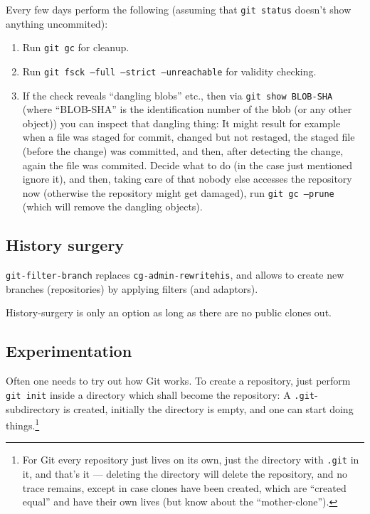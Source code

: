 \documentclass{book}
\newcommand{\filename}[1]{\texttt{#1}}
\begin{document}
Every few days perform the following (assuming that \texttt{git status} doesn't show anything uncommited):
\begin{enumerate}
\item Run \texttt{git gc} for cleanup.
\item Run \texttt{git fsck --full --strict --unreachable}  for validity checking.
\item If the check reveals ``dangling blobs'' etc., then via \texttt{git show BLOB-SHA} (where ``BLOB-SHA'' is the identification number of the blob (or any other object)) you can inspect that dangling thing: It might result for example when a file was staged for commit, changed but not restaged, the staged file (before the change) was committed, and then, after detecting the change, again the file was commited. Decide what to do (in the case just mentioned ignore it), and then, taking care of that nobody else accesses the repository now (otherwise the repository might get damaged), run \texttt{git gc --prune} (which will remove the dangling objects).
\end{enumerate}



\subsection{History surgery}
\label{sec:GitHistorysurgery}

\texttt{git-filter-branch} replaces \texttt{cg-admin-rewritehis}, and allows to create new branches (repositories) by applying filters (and adaptors).

History-surgery is only an option as long as there are no public clones out.




\subsection{Experimentation}
\label{sec:GitExperimentation}

Often one needs to try out how Git works. To create a repository, just perform \texttt{git init} inside a directory which shall become the repository: A \filename{.git}-subdirectory is created, initially the directory is empty, and one can start doing things.\footnote{For Git every repository just lives on its own, just the directory with \filename{.git} in it, and that's it --- deleting the directory will delete the repository, and no trace remains, except in case clones have been created, which are ``created equal'' and have their own lives (but know about the ``mother-clone'').}
\end{document}
